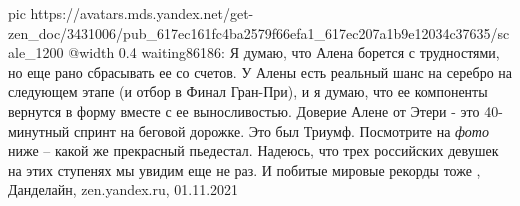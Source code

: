 \ifcmt
  pic https://avatars.mds.yandex.net/get-zen_doc/3431006/pub_617ec161fc4ba2579f66efa1_617ec207a1b9e12034c37635/scale_1200
  @width 0.4
\fi
waiting86186: Я думаю, что Алена борется с трудностями, но еще рано сбрасывать
ее со счетов. У Алены есть реальный шанс на серебро на следующем этапе (и отбор
в Финал Гран-При), и я думаю, что ее компоненты вернутся в форму вместе с ее
выносливостью. Доверие Алене от Этери - это 40-минутный спринт на беговой
дорожке.  Это был Триумф. Посмотрите на \emph{фото} ниже – какой же прекрасный
пьедестал.  Надеюсь, что трех российских девушек на этих ступенях мы увидим еще
не раз. И побитые мировые рекорды тоже
, 
Данделайн, zen.yandex.ru, 01.11.2021
